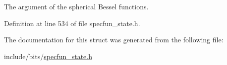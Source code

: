 The argument of the spherical Bessel functions. 



Definition at line 534 of file specfun\+\_\+state.\+h.



The documentation for this struct was generated from the following file\+:\begin{DoxyCompactItemize}
\item 
include/bits/\hyperlink{specfun__state_8h}{specfun\+\_\+state.\+h}\end{DoxyCompactItemize}
